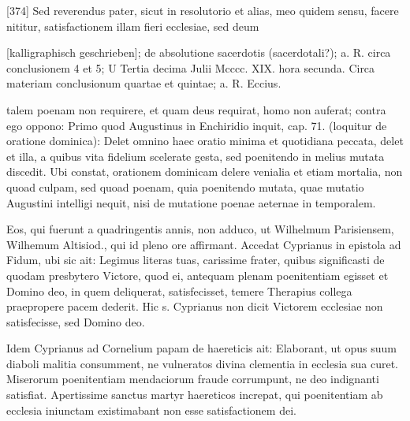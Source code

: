 [374] Sed reverendus pater, sicut in resolutorio et alias, meo quidem sensu, facere nititur, satisfactionem illam fieri ecclesiae, sed deum

[kalligraphisch geschrieben]; de absolutione sacerdotis (sacerdotali?); a. R. circa conclusionem 4 et 5; U Tertia decima Julii Mcccc. XIX. hora secunda. Circa materiam conclusionum quartae et quintae; a. R. Eccius.

talem poenam non requirere, et quam deus requirat, homo non auferat; contra ego oppono: Primo quod Augustinus in Enchiridio inquit, cap. 71. (loquitur de oratione dominica): Delet omnino haec oratio minima et quotidiana peccata, delet et illa, a quibus vita fidelium scelerate gesta, sed poenitendo in melius mutata discedit. Ubi constat, orationem dominicam delere venialia et etiam mortalia, non quoad culpam, sed quoad poenam, quia poenitendo mutata, quae mutatio Augustini intelligi nequit, nisi de mutatione poenae aeternae in temporalem.

Eos, qui fuerunt a quadringentis annis, non adduco, ut Wilhelmum Parisiensem, Wilhemum Altisiod., qui id pleno ore affirmant. Accedat Cyprianus in epistola ad Fidum, ubi sic ait: Legimus literas tuas, carissime frater, quibus significasti de quodam presbytero Victore, quod ei, antequam plenam poenitentiam egisset et Domino deo, in quem deliquerat, satisfecisset, temere Therapius collega praepropere pacem dederit. Hic s. Cyprianus non dicit Victorem ecclesiae non satisfecisse, sed Domino deo.

Idem Cyprianus ad Cornelium papam de haereticis ait: Elaborant, ut opus suum diaboli malitia consumment, ne vulneratos divina clementia in ecclesia sua curet. Miserorum poenitentiam mendaciorum fraude corrumpunt, ne deo indignanti satisfiat. Apertissime sanctus martyr haereticos increpat, qui poenitentiam ab ecclesia iniunctam existimabant non esse satisfactionem dei.

